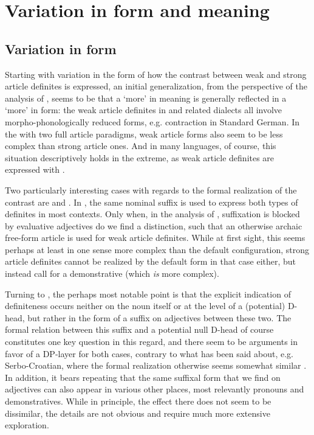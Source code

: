 \documentclass[output=paper
,modfonts
,nonflat]{langscibook}
\begin{document}
\section{Variation in form and meaning}

\subsection{Variation in form}

Starting with variation in the form of how the contrast between
weak and strong article definites is expressed, an initial
generalization, from the perspective of the analysis of
\citet{Schwarz2009}, seems to be that a `more' in meaning is generally
reflected in a `more' in form: the weak article definites in 
and related dialects all involve morpho-phonologically reduced forms,
e.g. contraction in Standard German. In the  with
two full article paradigms, weak article forms
also seem to be less complex than strong article ones. And in many
languages, of course, this situation descriptively holds in the
extreme, as weak article definites are expressed with . 

Two particularly interesting cases with regards to the formal
realization of the contrast are  and . In
, the same nominal suffix is used to express both types of
definites in most contexts. Only when, in the analysis of
\citet{Ingason2016}, suffixation is blocked by evaluative adjectives
do we find a distinction, such that an otherwise archaic free-form
article is used for weak article definites. While at first sight, this
seems perhaps at least in one sense more complex than the default
configuration, strong article definites cannot be realized by the
default form in that case either, but instead call for a
demonstrative (which \textit{is} more complex). 

Turning to , the perhaps most notable point is that the
explicit indication of definiteness occurs neither on the noun itself
or at the level of a (potential) D-head, but rather in the form of a suffix on
adjectives between these two. The formal relation between this
suffix and a potential null D-head of course constitutes one key
question in this regard, and there seem to be arguments in favor of a
DP-layer for both cases, contrary to what has been said about,
e.g. Serbo-Croatian, where the formal realization otherwise seems
somewhat similar \citep{Sereikaite2016}. In addition, it bears
repeating that the same suffixal form that we find on adjectives can
also appear in various other places, most relevantly pronouns and
demonstratives. While in principle, the effect there does not seem to
be dissimilar, the details are not obvious and require much more
extensive exploration.
\end{document}
